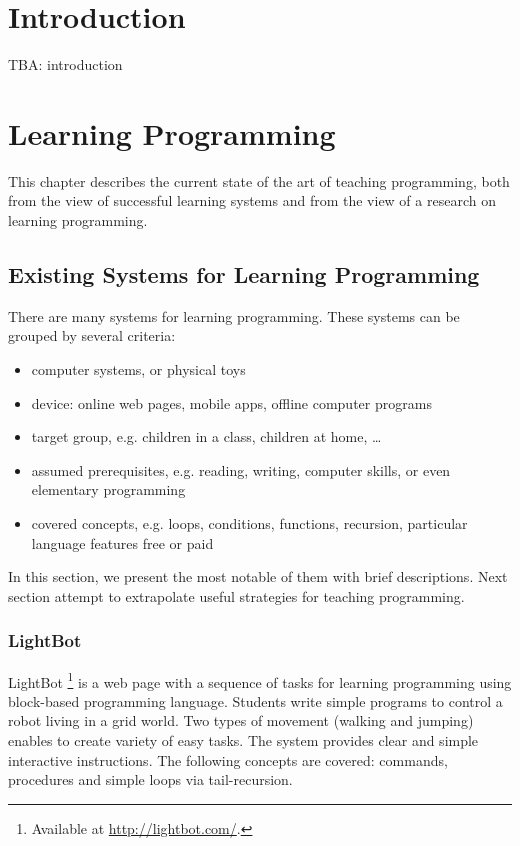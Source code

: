 \documentclass[
    digital,    %
    oneside,    %
    color,
    11pt,
    nocover,
    notable,
    nolof,
    nolot,
    final
]{fithesis3}
\begin{document}
\chapter{Introduction}
\label{chap:introduction}

TBA: introduction

\chapter{Learning Programming}
\label{chap:learning-programming}

This chapter describes the current state of the art of teaching programming, both from the view of successful learning systems and from the view of a research on learning programming.

\section{Existing Systems for Learning Programming}
\label{sec:existing-systems}

There are many systems for learning programming.
These systems can be grouped by several criteria:

\begin{itemize}
\item computer systems, or physical toys
\item device: online web pages, mobile apps, offline computer programs
\item target group, e.g. children in a class, children at home, …
\item assumed prerequisites, e.g. reading, writing, computer skills, or even elementary programming
\item covered concepts, e.g. loops, conditions, functions, recursion, particular language features
free or paid
\end{itemize}

In this section, we present the most notable of them with brief descriptions. Next section attempt to extrapolate useful strategies for teaching programming.


\subsection{LightBot}
\label{sec:lightbot}
LightBot%
\footnote{Available at \url{http://lightbot.com/}.}
is a web page with a sequence of tasks for learning programming using block-based programming language.
Students write simple programs to control a robot living in a grid world.
Two types of movement (walking and jumping) enables to create variety of easy tasks.
The system provides clear and simple interactive instructions.
The following concepts are covered: commands, procedures and simple loops via tail-recursion.
\end{document}
